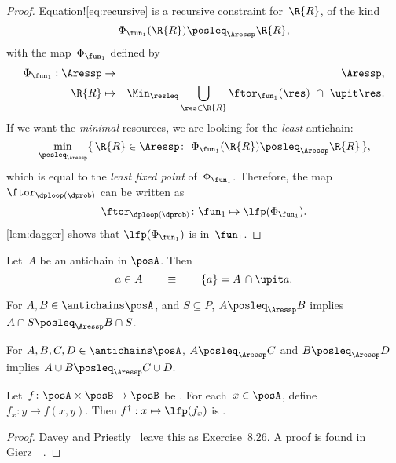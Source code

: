 \begin{proof}
    Equation!\cref{eq:recursive} is a recursive constraint for~$\R{R}$,
    of the kind
    \[
        \Phi_{\fun_{1}}(\R{R})\posleq_{\Aressp}\R{R},
    \]
    with the map~$\Phi_{\fun_{1}}$ defined by
    \begin{eqnarray}
        \Phi_{\fun_{1}}:\Aressp & \rightarrow & \Aressp,\label{eq:bigphi}\\
        \R{R} & \mapsto & \Min_{\resleq}\bigcup_{\res\in\R{R}}\ftor_{\fun_{1}}(\res)\ \cap\ \upit\res.\nonumber
    \end{eqnarray}
    If we want the \emph{minimal} resources, we are looking for the \emph{least}
    antichain:
    \[
        \min_{\posleq_{\Aressp}}\{\,\R{R}\in\Aressp\colon\ \Phi_{\fun_{1}}(\R{R})\posleq_{\Aressp}\R{R}\,\},
    \]
    which is equal to the \emph{least fixed point }of~$\Phi_{\fun_{1}}$.
    Therefore, the map $\ftor_{\dploop(\dprob)}$ can be written as
    \begin{equation}
        \ftor_{\dploop(\dprob)}\colon\fun_{1}\mapsto\lfp(\Phi_{\fun_{1}}).\label{eq:loop_fixpoint}
    \end{equation}
    \cref{lem:dagger} shows that $\lfp(\Phi_{\fun_{1}})$ is \scottcontinuous
    in~$\fun_{1}$.
\end{proof}

\begin{lemma}
    \label{lem:antichain-write}Let~$A$ be an antichain in $\posA$.
    Then
    \[
        a\in A\qquad\equiv\qquad\{a\}=A\,\cap\upit a.
    \]
\end{lemma}

\begin{lemma}
    \label{lem:antichain_inter}For $A,B\in\antichains\posA$, and $S\subseteq P$,
    $A\posleq_{\Aressp}B$ implies $A\cap S\posleq_{\Aressp}B\cap S$.
\end{lemma}

\begin{lemma}
    \label{lem:antichain_union}For $A,B,C,D\in\antichains\posA$, $A\posleq_{\Aressp}C$
    and $B\posleq_{\Aressp}D$ implies $A\cup B\posleq_{\Aressp}C\cup D.$
\end{lemma}

\begin{lemma}
    \label{lem:dagger}Let~$f\colon\posA\times\posB\rightarrow\posB$
    be \scottcontinuous. For each~$x\in\posA$, define $f_{x}:y\mapsto f(x,y).$
    Then $f^{\dagger}:x\mapsto\lfp(f_{x})$ is \scottcontinuous.
\end{lemma}
\begin{proof}
    Davey and Priestly~\cite{davey02} leave this as Exercise~8.26.
    A proof is found in Gierz~\etal~\cite[Exercise II-2.29]{gierz03continuous}.
\end{proof}


